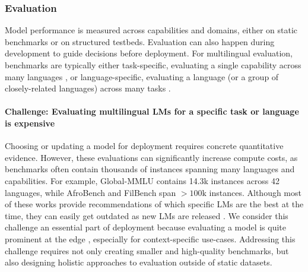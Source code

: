 \documentclass[11pt,a4paper]{article}
\begin{document}
\subsubsection{Evaluation}
\label{sec:evaluation}

Model performance is measured across capabilities and domains, either on static benchmarks or on structured testbeds. %
Evaluation can also happen during development to guide decisions before deployment.
For multilingual evaluation, benchmarks are typically either task-specific, evaluating a single capability across many languages \citep[\textit{inter alia}]{shi2023language,singh-etal-2025-global,gureja-etal-2025-rewardbench}, or
language-specific, evaluating a language (or a group of closely-related languages) across many tasks \citep{ojo-etal-2025-afrobench,miranda-etal-2025-filbench}.

\paragraph{Challenge: Evaluating multilingual LMs \icondata{} for a specific task or language is expensive \iconcompute{}}
Choosing or updating a model for deployment requires concrete quantitative evidence.
However, these evaluations can significantly increase compute costs, as benchmarks often contain thousands of instances spanning many languages and capabilities.
For example, Global-MMLU \citep{singh-etal-2025-global} contains 14.3k instances across 42 languages, while AfroBench \citep{ojo-etal-2025-afrobench} and FilBench \citep{miranda-etal-2025-filbench} span $>100\text{k}$ instances.
Although most of these works provide recommendations of which specific LMs are the best at the time, they can easily get outdated as new LMs are released \citep{reiter2026comparing}.
We consider this challenge an essential part of deployment because evaluating a model is quite prominent at the edge \citep{ramjee-etal-2025-ashabot,rutunda-etal-2026-large}, especially for context-specific use-cases.
Addressing this challenge requires not only creating smaller and high-quality benchmarks, but also designing holistic approaches to evaluation outside of static datasets.
\end{document}
